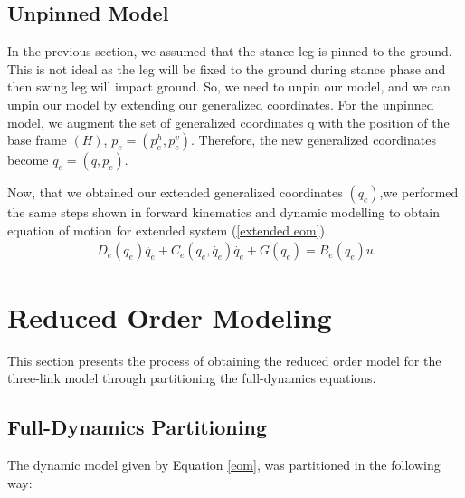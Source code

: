\documentclass[letterpaper, 10 pt, conference]{ieeeconf}  %
\begin{document}
\subsection{Unpinned Model}
In the previous section, we assumed that the stance leg is pinned to the ground. This is not ideal as the leg will be fixed to the ground during stance phase and then swing leg will impact ground. So, we need to unpin our model, and we can unpin our model by extending our generalized coordinates.
For the unpinned model, we augment the set of generalized coordinates q with the position of the base frame $\left(H\right)$, $p_e = \left(p^h_e, p^v_e\right)$. Therefore, the new generalized coordinates become $q_e = \left(q, p_e\right)$.\newline

Now, that we obtained our extended generalized coordinates $\left(q_{e}\right)$,we performed the same steps shown in forward kinematics and dynamic modelling to obtain equation of motion for extended system (\ref{extended eom}). 
%
\begin{equation}
\begin{aligned}
    D_e(q_e)\ddot{q_e} + C_e(q_e,\dot{q_e})\dot{q_e} + G(q_e) = B_e(q_e)u
\end{aligned}
\label{extended eom}
\end{equation}
%

\vspace{0.05cm}

\section{Reduced Order Modeling}
This section presents the process of obtaining the reduced order model for the three-link model through partitioning the full-dynamics equations.

\subsection{Full-Dynamics Partitioning}

The dynamic model given by Equation \ref{eom}, was partitioned in the following way:
\end{document}

